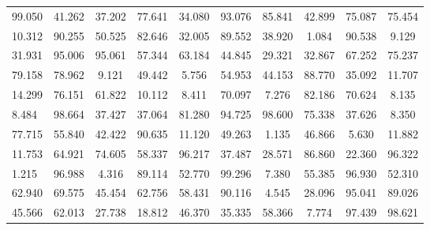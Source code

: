 \documentclass{article}
\begin{document}
\begin{table}[h!]
\begin{tabular}{lccccccccc}
99.050 & 41.262 & 37.202 & 77.641 & 34.080 & 93.076 & 85.841 & 42.899 & 75.087 & 75.454 \\
10.312 & 90.255 & 50.525 & 82.646 & 32.005 & 89.552 & 38.920 & 1.084 & 90.538 & 9.129 \\
31.931 & 95.006 & 95.061 & 57.344 & 63.184 & 44.845 & 29.321 & 32.867 & 67.252 & 75.237 \\
79.158 & 78.962 & 9.121 & 49.442 & 5.756 & 54.953 & 44.153 & 88.770 & 35.092 & 11.707 \\
14.299 & 76.151 & 61.822 & 10.112 & 8.411 & 70.097 & 7.276 & 82.186 & 70.624 & 8.135 \\
8.484 & 98.664 & 37.427 & 37.064 & 81.280 & 94.725 & 98.600 & 75.338 & 37.626 & 8.350 \\
77.715 & 55.840 & 42.422 & 90.635 & 11.120 & 49.263 & 1.135 & 46.866 & 5.630 & 11.882 \\
11.753 & 64.921 & 74.605 & 58.337 & 96.217 & 37.487 & 28.571 & 86.860 & 22.360 & 96.322 \\
1.215 & 96.988 & 4.316 & 89.114 & 52.770 & 99.296 & 7.380 & 55.385 & 96.930 & 52.310 \\
62.940 & 69.575 & 45.454 & 62.756 & 58.431 & 90.116 & 4.545 & 28.096 & 95.041 & 89.026 \\
45.566 & 62.013 & 27.738 & 18.812 & 46.370 & 35.335 & 58.366 & 7.774 & 97.439 & 98.621 \\
\bottomrule
\end{tabular}
\end{table}
\end{document}
